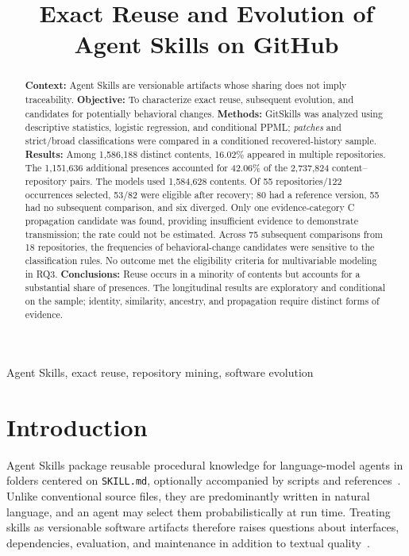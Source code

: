 \documentclass[conference]{IEEEtran}
\title{Exact Reuse and Evolution of Agent Skills on GitHub}
\author{\IEEEauthorblockN{Jemison dos Santos}
\IEEEauthorblockA{State University of Maringá, Paraná, Brazil\\
\texttt{jemison321@gmail.com}}}
\begin{document}
\maketitle

\begin{abstract}
\textbf{Context:} Agent Skills are versionable artifacts whose sharing does not imply traceability. \textbf{Objective:} To characterize exact reuse, subsequent evolution, and candidates for potentially behavioral changes. \textbf{Methods:} GitSkills was analyzed using descriptive statistics, logistic regression, and conditional PPML; \textit{patches} and strict/broad classifications were compared in a conditioned recovered-history sample. \textbf{Results:} Among 1,586,188 distinct contents, 16.02\% appeared in multiple repositories. The 1,151,636 additional presences accounted for 42.06\% of the 2,737,824 content--repository pairs. The models used 1,584,628 contents. Of 55 repositories/122 occurrences selected, 53/82 were eligible after recovery; 80 had a reference version, 55 had no subsequent comparison, and six diverged. Only one evidence-category C propagation candidate was found, providing insufficient evidence to demonstrate transmission; the rate could not be estimated. Across 75 subsequent comparisons from 18 repositories, the frequencies of behavioral-change candidates were sensitive to the classification rules. No outcome met the eligibility criteria for multivariable modeling in RQ3. \textbf{Conclusions:} Reuse occurs in a minority of contents but accounts for a substantial share of presences. The longitudinal results are exploratory and conditional on the sample; identity, similarity, ancestry, and propagation require distinct forms of evidence.
\end{abstract}

\begin{IEEEkeywords}
Agent Skills, exact reuse, repository mining, software evolution
\end{IEEEkeywords}

\section{Introduction}
Agent Skills package reusable procedural knowledge for language-model agents in folders centered on \texttt{SKILL.md}, optionally accompanied by scripts and references~\cite{agentskills-spec,gitskills}. Unlike conventional source files, they are predominantly written in natural language, and an agent may select them probabilistically at run time. Treating skills as versionable software artifacts therefore raises questions about interfaces, dependencies, evaluation, and maintenance in addition to textual quality~\cite{authoring-skills}.
\end{document}
